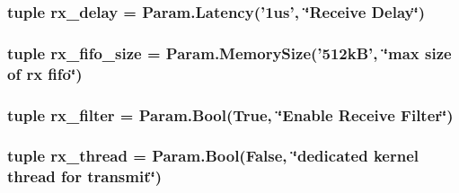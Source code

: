 \label{classEthernet_1_1EtherDevBase_af2015635a2dcdded8ab49040988fe57e}
\hypertarget{classEthernet_1_1EtherDevBase_aac27cf5563d0189f7f60a444745c50c3}{
\subsubsection[{rx\_\-delay}]{\setlength{\rightskip}{0pt plus 5cm}tuple {\bf rx\_\-delay} = Param.Latency('1us', \char`\"{}Receive Delay\char`\"{})}}
\label{classEthernet_1_1EtherDevBase_aac27cf5563d0189f7f60a444745c50c3}
\hypertarget{classEthernet_1_1EtherDevBase_a4b48836aef9c8017ad618a4a50417609}{
\subsubsection[{rx\_\-fifo\_\-size}]{\setlength{\rightskip}{0pt plus 5cm}tuple {\bf rx\_\-fifo\_\-size} = Param.MemorySize('512kB', \char`\"{}max size of rx fifo\char`\"{})}}
\label{classEthernet_1_1EtherDevBase_a4b48836aef9c8017ad618a4a50417609}
\hypertarget{classEthernet_1_1EtherDevBase_a45dfef9461f63f6c247eec19501795af}{
\subsubsection[{rx\_\-filter}]{\setlength{\rightskip}{0pt plus 5cm}tuple {\bf rx\_\-filter} = Param.Bool(True, \char`\"{}Enable Receive Filter\char`\"{})}}
\label{classEthernet_1_1EtherDevBase_a45dfef9461f63f6c247eec19501795af}
\hypertarget{classEthernet_1_1EtherDevBase_aefe87c7b07351d14e344d05f9f8b032d}{
\subsubsection[{rx\_\-thread}]{\setlength{\rightskip}{0pt plus 5cm}tuple {\bf rx\_\-thread} = Param.Bool(False, \char`\"{}dedicated kernel thread for transmit\char`\"{})}}
